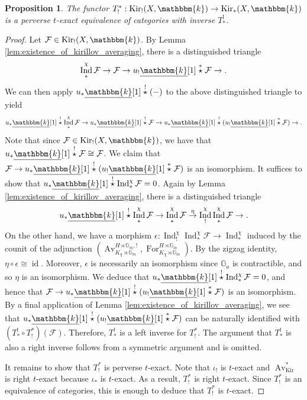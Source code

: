 \documentclass{amsart}
\newcommand{\G}{\mathbb{G}}
\renewcommand{\k}{\mathbbm{k}}
\newcommand{\scrF}{\mathcal{F}}
\DeclareMathOperator{\Ind}{Ind}
\DeclareMathOperator{\Av}{Av}
\newcommand{\uk}{\underline{\k}}
\DeclareMathOperator{\For}{For}
\DeclareMathOperator{\id}{id}
\DeclareMathOperator{\Kir}{Kir}
\newcommand{\sstar}{\stackrel{*}{\star}}
\newcommand{\cstar}{\stackrel{!}{\star}}
\newtheorem{proposition}[subsubsection]{Proposition}
\theoremstyle{definition}
\begin{document}
    \begin{proposition}\label{prop:translation_functors_are_equivs}
        The functor $T_{!}^* : \Kir_! (X, \k) \to \Kir_* (X, \k)$ is a perverse $t$-exact equivalence of categories with inverse $T_*^!$.
    \end{proposition}
    \begin{proof} 
        Let $\scrF \in \Kir_! (X, \k)$. By Lemma \ref{lem:existence_of_kirillov_averaging}, there is a distinguished triangle
        \[\Ind_*^{\chi} \scrF \to \scrF \to u_! \uk [1] \sstar \scrF \to.\]
        We can then apply $u_* \uk [1] \cstar (-)$ to the above distinguished triangle to yield 
        \[u_* \uk [1] \cstar \Ind_*^{\chi} \scrF \to u_* \uk [1] \cstar \scrF \to u_* \uk [1] \cstar (u_! \uk [1] \sstar \scrF) \to. \]
        Note that since $\scrF \in \Kir_! (X, \k)$, we have that $u_* \uk [1] \cstar \scrF \cong \scrF$.
        We claim that $\scrF \to u_* \uk [1] \cstar (u_! \uk [1] \sstar \scrF)$ is an isomorphism. It suffices to show that $u_* \uk [1] \cstar \Ind_*^{\chi} \scrF  = 0$.
        Again by Lemma \ref{lem:existence_of_kirillov_averaging}, there is a distinguished triangle
        \[u_* \uk [1] \cstar \Ind_*^{\chi} \scrF \to \Ind_*^{\chi} \scrF \stackrel{\eta}{\to} \Ind_!^{\chi} \Ind_*^{\chi} \scrF \to.\]
        On the other hand, we have a morphism $\epsilon : \Ind_!^{\chi} \Ind_*^{\chi} \scrF \to \Ind_*^{\chi}$ induced by the counit of the adjunction $(\Av^{H \rtimes \G_m, !}_{K_{\chi} \rtimes \G_m}, \For^{H \rtimes \G_m}_{K_{\chi} \rtimes \G_m})$.
        By the zigzag identity, $\eta \circ \epsilon \cong \id$. Moreover, $\epsilon$ is necessarily an isomorphism since $\G_a$ is contractible, and so $\eta$ is an isomorphism.
        We deduce that $u_* \uk [1] \cstar \Ind_*^{\chi} \scrF = 0$, and hence that $\scrF \to u_* \uk [1] \cstar (u_! \uk [1] \sstar \scrF)$ is an isomorphism.
        By a final application of Lemma \ref{lem:existence_of_kirillov_averaging}, we see that $u_* \uk [1] \cstar (u_! \uk [1] \sstar \scrF)$ can be naturally identified with $(T_*^! \circ T_!^*) (\scrF)$.
        Therefore, $T_*^!$ is a left inverse for $T_!^*$. The argument that $T_*^!$ is also a right inverse follows from a symmetric argument and is omitted.

        It remains to show that $T_!^*$ is perverse $t$-exact. Note that $\iota_!$ is $t$-exact and $\Av_{\Kir}^*$ is right $t$-exact because $\iota_*$ is $t$-exact.
        As a result, $T_!^*$ is right $t$-exact. Since $T_!^*$ is an equivalence of categories, this is enough to deduce that $T_!^*$ is $t$-exact.
    \end{proof}
\end{document}
